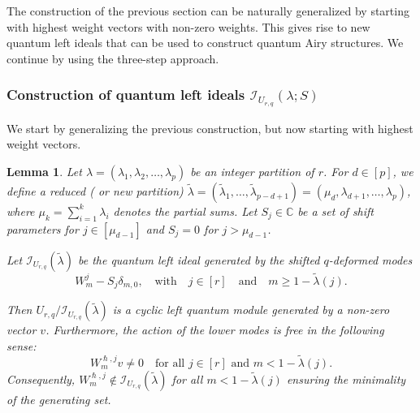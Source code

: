 \documentclass[reqno,11pt]{amsart}
\theoremstyle{plain}
\newtheorem{lemma}[theorem]{Lemma}
\theoremstyle{definition}
\theoremstyle{remark}
\numberwithin{equation}{section}
\newcommand{\1}{\mathds{1}}
\newcommand{\2}{\frac{1}{2}}
\begin{document}
{				The construction of the previous section can be naturally generalized by starting with highest weight vectors with non-zero weights. This gives rise to new quantum left ideals that can be used to construct quantum Airy structures. We continue by using the three-step approach.
				\subsubsection{Construction of quantum left ideals $\mathcal{I}_{U_{r,q}}(\lambda; S)$}
				
				We start by generalizing the previous
				construction, but now starting with highest weight vectors.
				\begin{lemma}\label{t:leftidealsshifted}
					Let $\lambda = (\lambda_1, \lambda_2, \ldots, \lambda_p)$ be an integer partition of $r$. For $d \in [p]$, we define a reduced ( or new partition) $\tilde{\lambda} =(\tilde{\lambda}_1, \ldots, \tilde{\lambda}_{p-d+1}) = (\mu_d, \lambda_{d+1} ,\ldots, \lambda_p)$, where $\mu_k = \sum_{i=1}^k \lambda_i$ denotes the partial sums.  Let $S_j \in \mathbb{C}$ be a set of shift parameters for $j \in [\mu_{d-1}]$ and $S_j =0$ for $j > \mu_{d-1}$.
					
					Let $\mathcal{I}_{U_{r,q}}(\tilde\lambda)$ be the  quantum left ideal generated by the shifted $q$-deformed modes \begin{equation}
						W^j_m - S_j \delta_{m,0}, \quad\mbox{with}\quad j \in [r]\quad \mbox{and}\quad m \geq 1 - \tilde{\lambda}(j).
					\end{equation}
					
					Then $U_{r,q}/ \mathcal{I}_{U_{r,q}}(\tilde \lambda)$ is a cyclic left quantum module generated by a non-zero vector $v$. Furthermore, the action of the lower modes is free in the following sense:
					\begin{equation}
						W^{\hslash, j}_m v \neq 0 \quad \text{for all } j \in [r] \text{ and } m < 1 - \tilde{\lambda}(j).
					\end{equation}
					Consequently, $W^{\hslash, j}_m \notin \mathcal{I}_{U_{r,q}}(\tilde\lambda)$ for all $m < 1 - \tilde{\lambda}(j)$ ensuring the minimality of the generating set.
				\end{lemma}
				
}
\end{document}
